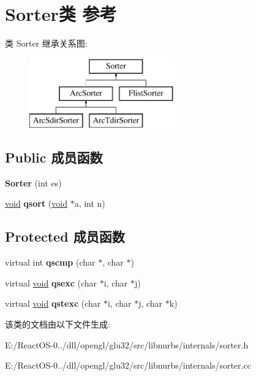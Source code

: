 \hypertarget{class_sorter}{}\section{Sorter类 参考}
\label{class_sorter}
类 Sorter 继承关系图\+:\begin{figure}[H]
\begin{center}
\leavevmode
\includegraphics[height=3.000000cm]{class_sorter}
\end{center}
\end{figure}
\subsection*{Public 成员函数}
\begin{DoxyCompactItemize}
\item 
\mbox{\label{class_sorter_a0af4371222bc2c8df5d8c1ed4b8d4331}} 
{\bfseries Sorter} (int es)
\item 
\mbox{\label{class_sorter_ab15c9d1b6c4d5098076c17b3f9d74351}} 
\hyperlink{interfacevoid}{void} {\bfseries qsort} (\hyperlink{interfacevoid}{void} $\ast$a, int n)
\end{DoxyCompactItemize}
\subsection*{Protected 成员函数}
\begin{DoxyCompactItemize}
\item 
\mbox{\label{class_sorter_af5f77c602b3933f8c4d2c25aff2925d2}} 
virtual int {\bfseries qscmp} (char $\ast$, char $\ast$)
\item 
\mbox{\label{class_sorter_ac49756448479edb1160372923e819d91}} 
virtual \hyperlink{interfacevoid}{void} {\bfseries qsexc} (char $\ast$i, char $\ast$j)
\item 
\mbox{\label{class_sorter_a1f72c2879589aa14caf82d390fc2db12}} 
virtual \hyperlink{interfacevoid}{void} {\bfseries qstexc} (char $\ast$i, char $\ast$j, char $\ast$k)
\end{DoxyCompactItemize}


该类的文档由以下文件生成\+:\begin{DoxyCompactItemize}
\item 
E\+:/\+React\+O\+S-\/0../dll/opengl/glu32/src/libnurbs/internals/sorter.\+h\item 
E\+:/\+React\+O\+S-\/0../dll/opengl/glu32/src/libnurbs/internals/sorter.\+cc\end{DoxyCompactItemize}
